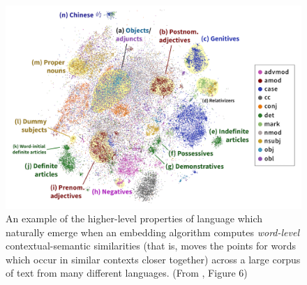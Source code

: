 \documentclass[11pt]{article}
\begin{document}
\begin{figure}[ht!]
	\centering
	\includegraphics[width=\textwidth]{../figs/xlang_embeddings.png}
	\caption{An example of the higher-level properties of language which naturally emerge when an embedding algorithm computes \textit{word-level} contextual-semantic similarities (that is, moves the points for words which occur in similar contexts closer together) across a large corpus of text from many different languages. (From \cite{chi_finding_2020}, Figure 6)}
	\label{fig:xlang-embeddings}
\end{figure}

\end{document}
